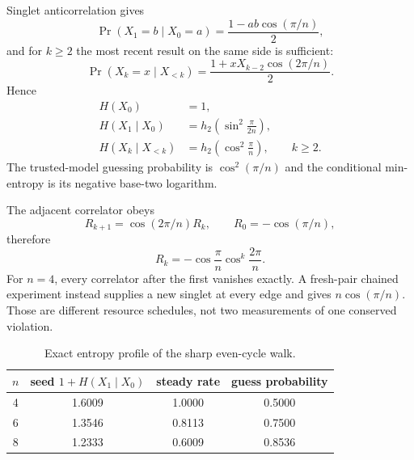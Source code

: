 \documentclass[11pt,a4paper]{article}
\begin{document}
Singlet anticorrelation gives
\begin{equation}
\Pr(X_1=b\mid X_0=a)=\frac{1-ab\cos(\pi/n)}2,
\end{equation}
and for $k\ge2$ the most recent result on the same side is sufficient:
\begin{equation}
\Pr(X_k=x\mid X_{<k})=
\frac{1+xX_{k-2}\cos(2\pi/n)}2.
\end{equation}
Hence
\begin{align}
H(X_0)&=1,\\
H(X_1\mid X_0)&=h_2\!\left(\sin^2\frac{\pi}{2n}\right),\\
H(X_k\mid X_{<k})&=h_2\!\left(\cos^2\frac{\pi}{n}\right),\qquad k\ge2.
\end{align}
The trusted-model guessing probability is $\cos^2(\pi/n)$ and the conditional min-entropy is its negative base-two logarithm.

The adjacent correlator obeys
\begin{equation}
R_{k+1}=\cos(2\pi/n)R_k,
\qquad R_0=-\cos(\pi/n),
\end{equation}
therefore
\begin{equation}
R_k=-\cos\frac{\pi}{n}\cos^k\frac{2\pi}{n}.
\end{equation}
For $n=4$, every correlator after the first vanishes exactly. A fresh-pair chained experiment instead supplies a new singlet at every edge and gives $n\cos(\pi/n)$. Those are different resource schedules, not two measurements of one conserved violation.

\begin{table}[H]\centering
\caption{Exact entropy profile of the sharp even-cycle walk.}
\begin{tabular}{cccc}
\toprule
$n$&seed $1+H(X_1\mid X_0)$&steady rate&guess probability\\\midrule
4&1.6009&1.0000&0.5000\\
6&1.3546&0.8113&0.7500\\
8&1.2333&0.6009&0.8536\\
\bottomrule
\end{tabular}
\end{table}
\end{document}
